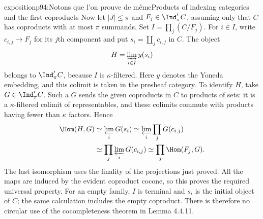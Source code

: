 \begin{dcomment}{exposition}{p94:Notons que l'on prouve de même}{Products of indexing categories and the first coproducts}
Now let $|J|\leq\pi$ and $F_j\in\Ind'_\pi C$, assuming only that $C$ has coproducts with at most $\pi$ summands. Set $I=\prod_j(C/F_j)$. For $i\in I$, write $c_{i,j}\to F_j$ for its $j$th component and put $s_i=\coprod_jc_{i,j}$ in $C$. The object
\[
H=\varinjlim_{i\in I}y(s_i)
\]
belongs to $\Ind'_\pi C$, because $I$ is $\kappa$-filtered. Here $y$ denotes the Yoneda embedding, and this colimit is taken in the presheaf category. To identify $H$, take $G\in\Ind'_\pi C$. Such a $G$ sends the given coproducts in $C$ to products of sets: it is a $\kappa$-filtered colimit of representables, and these colimits commute with products having fewer than $\kappa$ factors. Hence
\[
\begin{aligned}
\Hom(H,G)
&\simeq\varprojlim_iG(s_i)
\simeq\varprojlim_i\prod_jG(c_{i,j})\\
&\simeq\prod_j\varprojlim_iG(c_{i,j})
\simeq\prod_j\Hom(F_j,G).
\end{aligned}
\]
The last isomorphism uses the finality of the projections just proved. All the maps are induced by the evident coproduct cocone, so this proves the required universal property. For an empty family, $I$ is terminal and $s_i$ is the initial object of $C$; the same calculation includes the empty coproduct. There is therefore no circular use of the cocompleteness theorem in Lemma 4.4.11.
\end{dcomment}

